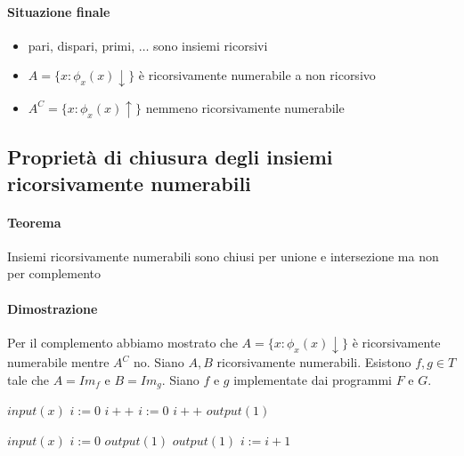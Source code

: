 \documentclass{article}
\begin{document}
\paragraph{Situazione finale}
\begin{itemize}
	\item pari, dispari, primi, $\dots$ sono insiemi ricorsivi
	\item $A=\{ x: \phi_x(x) \downarrow \}$ è ricorsivamente numerabile a non ricorsivo
	\item $A^C=\{ x: \phi_x(x) \uparrow \}$ nemmeno ricorsivamente numerabile
\end{itemize}

\subsection{Proprietà di chiusura degli insiemi ricorsivamente numerabili}
\paragraph{Teorema} Insiemi ricorsivamente numerabili sono chiusi per unione e intersezione ma non per complemento
\paragraph{Dimostrazione} Per il complemento abbiamo mostrato che $A=\{ x: \phi_x(x) \downarrow \}$ è ricorsivamente numerabile mentre $A^C$ no. Siano $A,B$ ricorsivamente numerabili. Esistono $f,g \in T$ tale che $A=Im_f$ e $B=Im_g$.
Siano $f$ e $g$ implementate dai programmi $F$ e $G$.
 
\begin{algorithm}[h]
	\caption{$P' \equiv$}
        \begin{algorithmic}[1]
			\State $input(x)$
			\State $i:=0$
        			\State $i++$
        		\EndWhile
        		\State $i:=0$
        			\State $i++$
        		\EndWhile
        		\State $output(1)$
        \end{algorithmic}
    \end{algorithm}
    
    
\begin{algorithm}[h]
	\caption{$P'' \equiv$}
        \begin{algorithmic}[1]
			\State $input(x)$
			\State $i:=0$
        			\State $output(1)$
        		\EndIf
        			\State $output(1)$
        		\EndIf
        		\State $i:=i+1$
        	\EndWhile
        \end{algorithmic}
    \end{algorithm}
\end{document}
